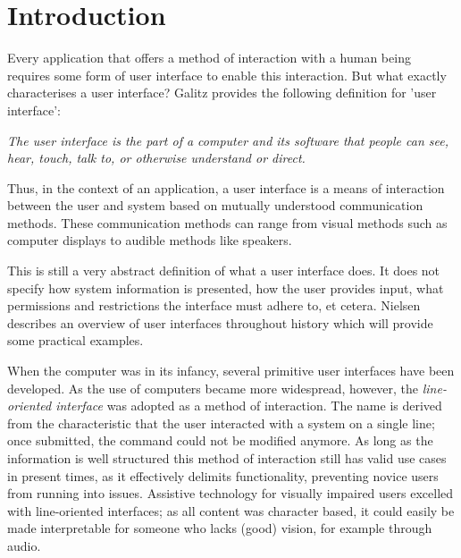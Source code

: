 \chapter{Introduction}
\label{chapter:introduction}
Every application that offers a method of interaction with a human being requires some form of user interface to enable this interaction. But what exactly characterises a user interface? Galitz\cite{galitz2007essential} provides the following definition for 'user interface':
\begin{displayquote}
\textit{The user interface is the part of a computer and its software that people can see, hear, touch, talk to, or otherwise understand or direct.}
\end{displayquote}

Thus, in the context of an application, a user interface is a means of interaction between the user and system based on mutually understood communication methods. These communication methods can range from visual methods such as computer displays to audible methods like speakers. 

This is still a very abstract definition of what a user interface does. It does not specify how system information is presented, how the user provides input, what permissions and restrictions the interface must adhere to, et cetera. Nielsen\cite{nielsen1994usability} describes an overview of user interfaces throughout history which will provide some practical examples.

When the computer was in its infancy, several primitive user interfaces have been developed. As the use of computers became more widespread, however, the \textit{line-oriented interface} was adopted as a method of interaction. The name is derived from the characteristic that the user interacted with a system on a single line; once submitted, the command could not be modified anymore. As long as the information is well structured this method of interaction still has valid use cases in present times, as it effectively delimits functionality, preventing novice users from running into issues. Assistive technology for visually impaired users excelled with line-oriented interfaces; as all content was character based, it could easily be made interpretable for someone who lacks (good) vision, for example through audio\cite{poll1996visualising}.

